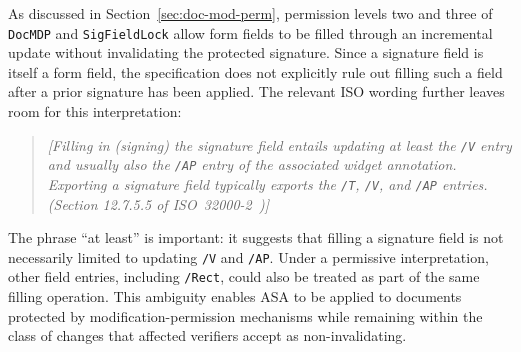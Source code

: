 \documentclass[12pt]{article}
\begin{document}
As discussed in Section~\ref{sec:doc-mod-perm}, permission levels two and three of \texttt{DocMDP} and \texttt{SigFieldLock} allow form fields to be filled through an incremental update without invalidating the protected signature. Since a signature field is itself a form field, the specification does not explicitly rule out filling such a field after a prior signature has been applied. The relevant ISO wording further leaves room for this interpretation:

\begin{quote}
	\emph{[Filling in (signing) the signature field entails updating at least the \texttt{/V} entry and usually also the \texttt{/AP} entry of the associated widget annotation. Exporting a signature field typically exports the \texttt{/T}, \texttt{/V}, and \texttt{/AP} entries. (Section 12.7.5.5 of ISO~32000-2~\cite{iso32000-2})]}
\end{quote}

The phrase ``at least'' is important: it suggests that filling a signature field is not necessarily limited to updating \texttt{/V} and \texttt{/AP}. Under a permissive interpretation, other field entries, including \texttt{/Rect}, could also be treated as part of the same filling operation. This ambiguity enables ASA to be applied to documents protected by modification-permission mechanisms while remaining within the class of changes that affected verifiers accept as non-invalidating.
\end{document}
